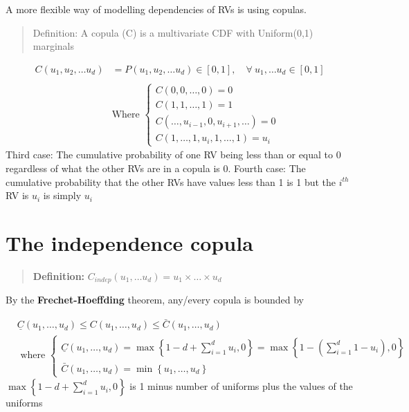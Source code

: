 \documentclass[
  oneside]{book}
\begin{document}
A more flexible way of modelling dependencies of RVs is using copulas.

\begin{quote}
Definition: A copula (C) is a multivariate CDF with Uniform(0,1) marginals
\end{quote}

\[
\begin{aligned}
C(u_{1}, u_{2}, \dots u_{d}) &=P(u_{1}, u_{2}, \dots u_{d}) \in [0,1], \quad \forall \ u_{1},\dots u_{d} \in [0,1]\\ 
\\
&\text{Where }\begin{cases}
C(0,0, \ldots, 0)=0 \\
C(1,1, \ldots, 1)=1 \\
C\left(\ldots, u_{i-1}, 0, u_{i+1}, \ldots\right)=0 \\
C\left(1, \ldots, 1, u_i, 1, \ldots, 1\right)=u_i
\end{cases}
\end{aligned}
\]
Third case: The cumulative probability of one RV being less than or equal to 0 regardless of what the other RVs are in a copula is 0.
Fourth case: The cumulative probability that the other RVs have values less than 1 is 1 but the \(i^{th}\) RV is \(u_{i}\) is simply \(u_{i}\)

\hypertarget{the-independence-copula}{%
\section{The independence copula}\label{the-independence-copula}}

\begin{quote}
\textbf{Definition:} \(C_{indep} (u_{1}, \dots u_{d}) = u_{1} \times \dots \times u_{d}\)
\end{quote}

By the \textbf{Frechet-Hoeffding} theorem, any/every copula is bounded by

\[
\begin{aligned}
& \underline{C}\left(u_1, \ldots, u_d\right) \leq C\left(u_1, \ldots, u_d\right) \leq \bar{C}\left(u_1, \ldots, u_d\right) \\
& \text { where }
\begin{cases}
\underline{C}\left(u_1, \ldots, u_d\right)=\max \left\{1-d+\sum_{i=1}^d u_i, 0\right\} = \max\left\{ 1 - \left(\sum^d_{i=1} 1 - u_{i}\right),0 \right\} \\
\bar{C}\left(u_1, \ldots, u_d\right)=\min \left\{u_1, \ldots, u_d\right\}
\end{cases}
\end{aligned}
\]
\(\max \left\{1-d+\sum_{i=1}^d u_i, 0\right\}\) is 1 minus number of uniforms plus the values of the uniforms
\end{document}

